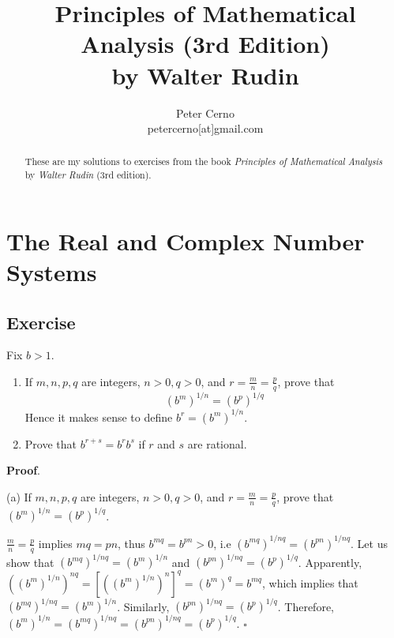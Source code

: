 \documentclass[10pt,varwidth=6in,margin=0.2in,preview]{standalone}
\title{
    Principles of Mathematical Analysis (3rd Edition)\\
    by Walter Rudin
}
\author{
    Peter Cerno\\
    \small petercerno[at]gmail.com
}
\begin{document}
\pagecolor{pagecolor}


\date{}
\maketitle

\begin{abstract}
These are my solutions to exercises from the book \emph{Principles of Mathematical Analysis} by \emph{Walter Rudin} (3rd edition).
\end{abstract}


\setcounter{section}{0}
\section{The Real and Complex Number Systems}

\setcounter{subsection}{5}
\subsection{Exercise}

Fix $b > 1$.


\begin{enumerate}[label=(\alph*)]

\item
If $m, n, p, q$ are integers, $n > 0, q > 0$, and $r = \frac{m}{n} = \frac{p}{q}$, prove that
\[ (b^m)^{1/n} = (b^p)^{1/q} \]
Hence it makes sense to define $b^r = (b^m)^{1/n}$.


\item
Prove that $b^{r+s} = b^r b^s$ if $r$ and $s$ are rational.

\end{enumerate}


\textbf{Proof}.

\vspace{0.1in}

(a) If $m, n, p, q$ are integers, $n > 0, q > 0$, and $r = \frac{m}{n} = \frac{p}{q}$, prove that $(b^m)^{1/n} = (b^p)^{1/q}$.

\vspace{0.1in}

$\frac{m}{n} = \frac{p}{q}$ implies $mq = pn$, thus $b^{mq} = b^{pn} > 0$, i.e $(b^{mq})^{1/nq} = (b^{pn})^{1/nq}$.
Let us show that $(b^{mq})^{1/nq} = (b^m)^{1/n}$ and $(b^{pn})^{1/nq} = (b^p)^{1/q}$.
Apparently, $\left( (b^m)^{1/n} \right)^{nq} = \left[ \left( (b^m)^{1/n} \right)^n \right]^q = (b^m)^q = b^{mq}$, which implies that $(b^{mq})^{1/nq} = (b^m)^{1/n}$.
Similarly, $(b^{pn})^{1/nq} = (b^p)^{1/q}$.
Therefore, $(b^m)^{1/n} = (b^{mq})^{1/nq} = (b^{pn})^{1/nq} = (b^p)^{1/q}$. $\square$
\end{document}

